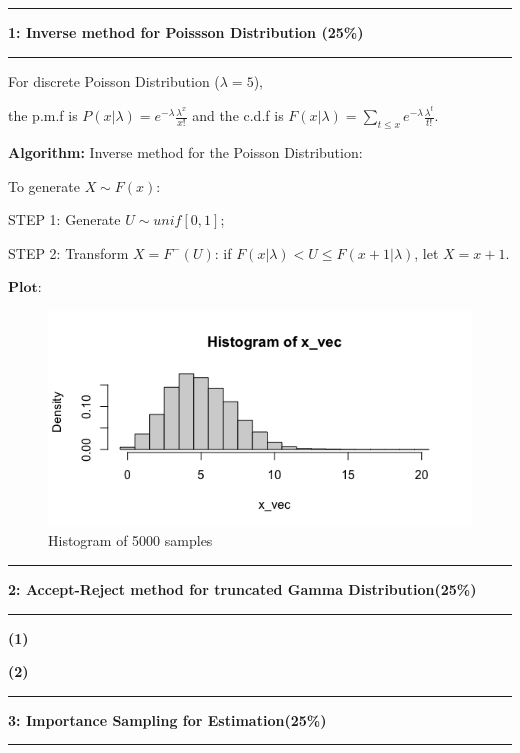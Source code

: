 \documentclass[11pt]{article}
\newcommand\question[2]{\vspace{.25in}\hrule\textbf{#1: #2}\vspace{.5em}\hrule\vspace{.10in}}
\renewcommand\part[1]{\vspace{.10in}\textbf{(#1)}}
\newcommand\algorithm{\vspace{.10in}\textbf{Algorithm: }}
\begin{document}
\raggedright
\newcommand\NAME{ZHANG Xinfang}  %
\newcommand\ANDREWID{1155141566}     %
\newcommand\HWNUM{2}              %

\question{1}{Inverse method for Poissson Distribution (25\%)} 
For discrete Poisson Distribution ($\lambda = 5$),

the p.m.f is $P(x|\lambda) = e^{-\lambda} \frac{\lambda^x}{x!}$ and
the c.d.f is $F(x|\lambda) = \sum_{t \leq x} e^{-\lambda} \frac{\lambda^t}{t!}$.

\algorithm
Inverse method for the Poisson Distribution:

To generate $X \sim F(x)$:

STEP 1: Generate $U \sim unif[0, 1]$;

STEP 2: Transform $X = F^-(U)$: if $F(x|\lambda) < U \leq F(x+1|\lambda)$, let $X = x+1$.

$\mathbf{Plot:}$

\begin{figure}[H]
    \centering
    \includegraphics[width=15cm]{figures/q1_plot.png}
    \caption{Histogram of 5000 samples}
  \end{figure}
\question{2}{Accept-Reject method for truncated Gamma Distribution(25\%)}

\part{1} 

\part{2}

\question{3}{Importance Sampling for Estimation(25\%)}
\end{document}
